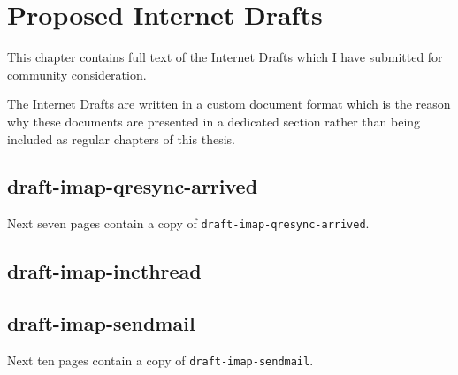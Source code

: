 \documentclass[trojita]{subfiles}
\begin{document}
\chapter{Proposed Internet Drafts}
\label{sec:id-manuscripts}

This chapter contains full text of the Internet Drafts which I have submitted for community consideration.

The Internet Drafts are written in a custom document format which is the reason why these documents are presented in a
dedicated section rather than being included as regular chapters of this thesis.

\section{draft-imap-qresync-arrived}

Next seven pages contain a copy of {\tt draft-imap-qresync-arrived}.



\section{draft-imap-incthread}


\section{draft-imap-sendmail}

Next ten pages contain a copy of {\tt draft-imap-sendmail}.


\end{document}
